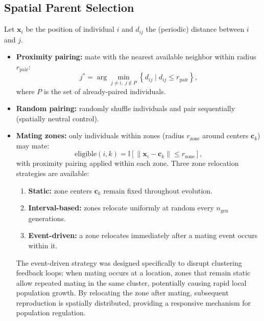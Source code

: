\documentclass[dvipsnames,format=sigconf,anonymous=false,review=false]{acmart}
\begin{document}
\subsection{Spatial Parent Selection}
\label{sec:parent_sel}
Let $\mathbf{x}_i$ be the position of individual $i$ and $d_{ij}$ the (periodic) distance between $i$ and $j$.
\begin{itemize}
  \item \textbf{Proximity pairing:} mate with the nearest available neighbor within radius $r_{\text{pair}}$:
  \begin{equation}
  j^*=\arg\min_{j\neq i,\; j\notin P}\left\{d_{ij}\mid d_{ij}\le r_{\text{pair}}\right\},
  \end{equation}
  where $P$ is the set of already-paired individuals.
  \item \textbf{Random pairing:} randomly shuffle individuals and pair sequentially (spatially neutral control).
  \item \textbf{Mating zones:} only individuals within zones (radius $r_{\text{zone}}$ around centers $\mathbf{c}_k$) may mate:
  \begin{equation}
  \mathrm{eligible}(i,k)=\mathbb{I}\!\left[\|\mathbf{x}_i-\mathbf{c}_k\|\le r_{\text{zone}}\right],
  \end{equation}
  with proximity pairing applied within each zone. Three zone relocation strategies are available:
  \begin{enumerate}
    \item \textbf{Static:} zone centers $\mathbf{c}_k$ remain fixed throughout evolution.
    \item \textbf{Interval-based:} zones relocate uniformly at random every $n_{\text{gen}}$ generations.
    \item \textbf{Event-driven:} a zone relocates immediately after a mating event occurs within it.
  \end{enumerate}
  The event-driven strategy was designed specifically to disrupt clustering feedback loops: when mating occurs at a location, zones that remain static allow repeated mating in the same cluster, potentially causing rapid local population growth. By relocating the zone after mating, subsequent reproduction is spatially distributed, providing a responsive mechanism for population regulation.
\end{itemize}
\end{document}
